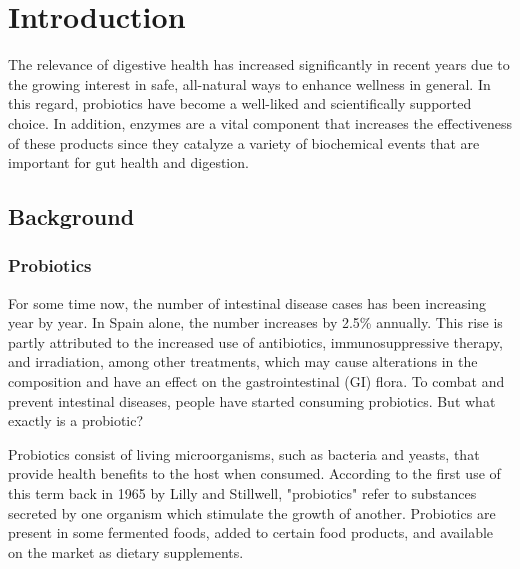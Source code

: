 \documentclass[12pt,twoside]{article}
\begin{document}
\clearpage{\pagestyle{empty}}

\tableofcontents 
\clearpage{\pagestyle{empty}}
\setcounter{page}{1}
\fancyhead[LE,RO]{\slshape \rightmark}
\fancyhead[LO,RE]{\slshape \leftmark}


\section{Introduction}


The relevance of digestive health has increased significantly in recent years due to the growing interest in safe, all-natural ways to enhance wellness in general. In this regard, probiotics have become a well-liked and scientifically supported choice.  In addition, enzymes are a vital component that increases the effectiveness of these products since they catalyze a variety of biochemical events that are important for gut health and digestion.


\subsection{Background}
\subsubsection{Probiotics}

For some time now, the number of intestinal disease cases has been increasing year by year. In Spain alone, the number increases by 2.5\% annually. This rise is partly attributed to the increased use of antibiotics, immunosuppressive therapy, and irradiation, among other treatments, which may cause alterations in the composition and have an effect on the gastrointestinal (GI) flora\cite{Gupta2009}. To combat and prevent intestinal diseases, people have started consuming probiotics. But what exactly is a probiotic?

Probiotics consist of living microorganisms, such as bacteria and yeasts, that provide health benefits to the host when consumed. According to the first use of this term back in 1965 by Lilly and Stillwell, "probiotics" refer to substances secreted by one organism which stimulate the growth of another\cite{Gupta2009}. Probiotics are present in some fermented foods, added to certain food products, and available on the market as dietary supplements.
\end{document}
